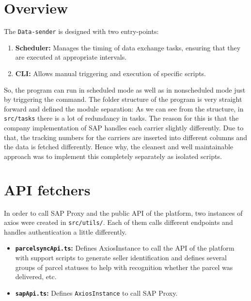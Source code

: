 \section{Overview}

The \texttt{Data-sender} is designed with two entry-points:
\begin{enumerate}
    \item \textbf{Scheduler:} Manages the timing of data exchange tasks, ensuring that they are executed at appropriate intervals.
    \item \textbf{\ac{CLI}:} Allows manual triggering and execution of specific scripts.
\end{enumerate}
So, the program can run in scheduled mode as well as in nonscheduled mode just by triggering the command. 
The folder structure of the program is very straight forward and defined the module separation:
As we can see from the structure, in \texttt{src/tasks} there is a lot of redundancy in tasks.
The reason for this is that the company implementation of SAP handles each carrier slightly differently.
Due to that, the tracking numbers for the carriers are inserted into different columns and the data is fetched differently. 
Hence why, the cleanest and well maintainable approach was to implement this completely separately as isolated scripts.

\section{API fetchers}
In order to call SAP Proxy and the public API of the platform, two instances of \gls{axios} were created in \texttt{src/utils/}.
Each of them calls different endpoints and handles authentication a little differently.
\begin{itemize}
    \item \textbf{\texttt{parcelsyncApi.ts}:} Defines \gls{AxiosInstance} to call the API of the platform with support scripts to generate seller identification and defines several groups of parcel statuses to help with recognition whether the parcel was delivered, etc.
    \item \textbf{\texttt{sapApi.ts}:} Defines \texttt{AxiosInstance} to call SAP Proxy.
\end{itemize}

